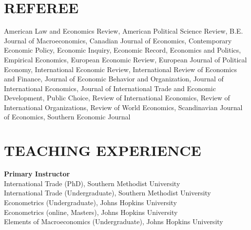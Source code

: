 \documentclass[11pt]{res}
\begin{document}
\begin{resume}
\section{REFEREE} \vspace{1.5mm}
American Law and Economics Review, American Political Science Review, B.E. Journal of Macroeconomics, Canadian Journal of Economics, Contemporary Economic Policy, Economic Inquiry, 
Economic Record, Economics and Politics, Empirical Economics, European Economic Review, European Journal of Political Economy, International Economic Review, International Review of Economics and Finance, Journal of Economic Behavior and Organization, Journal of International Economics, Journal of International Trade and Economic Development, Public Choice, Review of International Economics, Review of International Organizations, Review of World Economics, Scandinavian Journal of Economics, Southern Economic Journal

\section{TEACHING EXPERIENCE} \vspace{1.5mm}
{\bf Primary Instructor}\vspace{1.5mm}\\
International Trade (PhD), Southern Methodist University\vspace{1.5mm}\\
International Trade (Undergraduate), Southern Methodist University\vspace{1.5mm}\\
Econometrics (Undergraduate), Johns Hopkins University\vspace{1.5mm}\\
Econometrics (online, Masters), Johns Hopkins University\vspace{1.5mm}\\
Elements of Macroeconomics (Undergraduate), Johns Hopkins University\vspace{1.5mm}\\


\end{resume}
\end{document}
